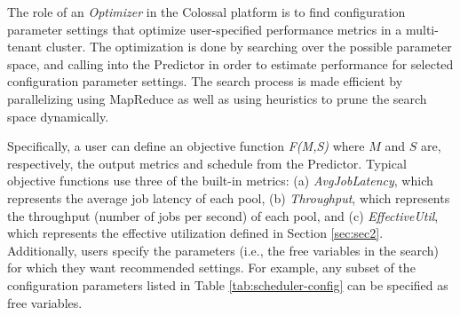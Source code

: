 The role of an {\em Optimizer} in the 
Colossal platform is to find configuration parameter settings that 
optimize user-specified performance metrics
in a multi-tenant cluster. The optimization is done by 
searching over the possible parameter space, and 
calling into the Predictor in order to estimate performance
for selected configuration parameter settings. The search process 
is made efficient by parallelizing using MapReduce as well as 
using heuristics to prune the search space dynamically.

Specifically, a user can define an objective function {\em F(M,S)} 
where $M$ and $S$ are, respectively, the output metrics and
schedule from the Predictor. Typical objective functions use
three of the built-in metrics:
(a) {\em AvgJobLatency}, which represents the average job
latency of each pool, (b) {\em Throughput}, which represents the throughput
(number of jobs per second) of each pool, and (c) {\em EffectiveUtil}, 
which represents the effective utilization defined in 
Section \ref{sec:sec2}. Additionally,  users 
specify the parameters (i.e., the free variables in the search) 
for which they want recommended settings. For example, 
any subset of the configuration parameters listed in 
Table \ref{tab:scheduler-config} can be specified 
as free variables. 

